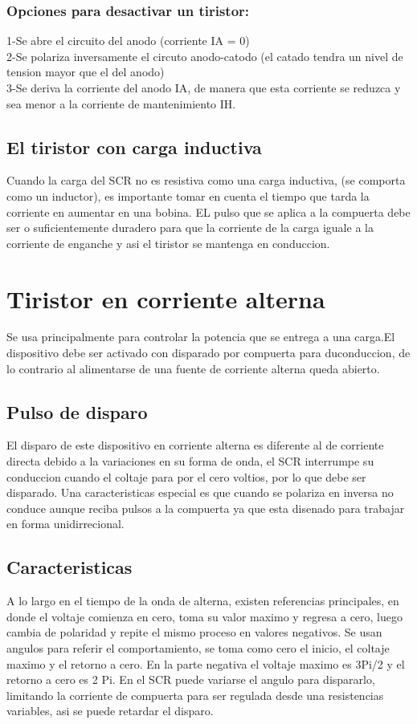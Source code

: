 \documentclass[12pt,a4paper]{report}
\begin{document}
\subsection{Opciones para desactivar un tiristor:}
1-Se abre el circuito del anodo (corriente IA = 0)
\\
2-Se polariza inversamente el circuto anodo-catodo (el catado tendra un nivel de tension mayor que el del anodo)
\\
3-Se deriva la corriente del anodo IA, de manera que esta corriente se reduzca y sea menor a la corriente de mantenimiento IH.
\section{El tiristor con carga inductiva}
Cuando la carga del SCR no es resistiva como una carga inductiva, (se comporta como un inductor), es importante tomar en cuenta el tiempo que tarda la corriente en aumentar en una bobina. EL pulso que se aplica a la compuerta debe ser o suficientemente duradero para que la corriente de la carga iguale a la corriente de enganche y asi el tiristor se mantenga en  conduccion.
\chapter{Tiristor en corriente alterna}
Se usa principalmente para controlar la potencia que se entrega a una carga.El dispositivo debe ser activado con disparado por compuerta para duconduccion, de lo contrario al alimentarse de una fuente de corriente alterna queda abierto.
\section{Pulso de disparo}
El disparo de este dispositivo en corriente alterna es diferente al de corriente directa debido a la variaciones en su forma de onda, el SCR interrumpe su conduccion cuando el coltaje para por el cero voltios, por lo que debe ser disparado. Una caracteristicas especial es que cuando se polariza en inversa no conduce aunque reciba pulsos a la compuerta ya que esta disenado para trabajar en forma unidirrecional.
\section{Caracteristicas}
A lo largo en el tiempo de la onda de alterna, existen referencias principales, en donde el voltaje comienza en cero, toma su valor maximo y regresa a cero, luego cambia de polaridad y repite el mismo proceso en valores negativos. Se usan angulos para referir el comportamiento, se toma como cero el inicio, el coltaje maximo y el retorno a cero. En la parte negativa el voltaje maximo es 3Pi/2  y el retorno a cero es 2 Pi. En el SCR puede variarse el angulo para dispararlo, limitando la corriente de compuerta para ser regulada desde una resistencias variables, asi se puede retardar el disparo.
\end{document}
